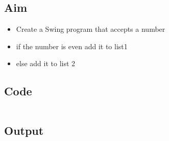 \documentclass[../main.tex]{subfiles}
\begin{document}
\subsection{Aim}
\begin{itemize}
	\item Create a Swing program that accepts a number
	\item if the number is even add it to list1
	\item else add it to list 2
\end{itemize}

\subsection{Code}
\inputminted[frame=lines, breaklines, breakanywhere, numberblanklines=false]{java}{./projects/prog12/Swing.java}

\subsection{Output}
\end{document}

